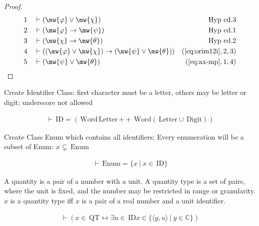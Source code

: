 \begin{proof}
\begin{align}
  1 &&  & \vdash ( \mw{\varphi} \vee \mw{\chi} )&\text{Hyp~cd.3}\notag%
  \\ 2 &&  & \vdash ( \mw{\varphi} \rightarrow \mw{\psi} )&\text{Hyp~cd.1}\notag%
  \\ 3 &&  & \vdash ( \mw{\chi} \rightarrow \mw{\theta} )&\text{Hyp~cd.2}\notag%
  \\ 4 &&  & \vdash ( ( \mw{\varphi} \vee \mw{\chi} ) \rightarrow ( \mw{\psi} \vee \mw{\theta} ) )&(\mbox{\ref{eq:orim12i}},2,3)\notag
  \\ 5 &&  & \vdash ( \mw{\psi} \vee \mw{\theta} )&(\mbox{\ref{eq:ax-mp}},1,4)\notag
\end{align}
\end{proof}

\begin{metadefinition} Create Identifier Class; first
character must be a letter,
others may be letter or digit; underscore not allowed

\begin{align}
\vdash \,\mathrm{ID} = ( \,\mathrm{Word } \,\mathrm{Letter} \,\mathrm{ ++ }
    \,\mathrm{Word } ( \,\mathrm{Letter} \cup \,\mathrm{Digit} )
    )\label{eq:df-bl.id}\tag{df-bl.id}
\end{align}
\end{metadefinition}

\begin{metadefinition} Create Class Enum which contains all
identifiers;
Every enumeration will be a subset of Enum: $x \subsetneq \,\mathrm{Enum}$

\begin{align}
\vdash \,\mathrm{Enum} = \{ x~\vert~x \in \,\mathrm{ID}
    \}\label{eq:df-bl.enum}\tag{df-bl.enum}
\end{align}
\end{metadefinition}

\begin{metadefinition} A quantity is a pair of a number with a
unit.  A quantity type is a set of
pairs, where the unit is fixed, and the number may be restricted in range or
granularity.
$x$ is a quantity type iff $x$ is a pair of a real number and a unit
identifier.

\begin{align}
\vdash ( x \in \,\mathrm{QT} \leftrightarrow \exists u \in \,\mathrm{ID} x \in
    \{ \langle y , u \rangle~\vert~y \in \mathbb{C} \}
    )\label{eq:df-bl.qt}\tag{df-bl.qt}
\end{align}
\end{metadefinition}


